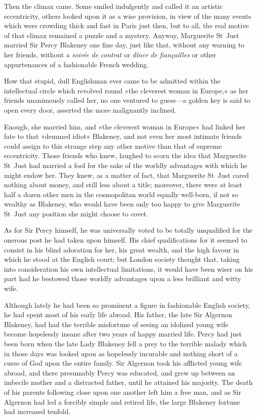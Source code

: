 Then the climax came. Some smiled indulgently and called it an artistic eccentricity, others looked upon it as a wise provision, in view of the many events which were crowding thick and fast in Paris just then, but to all, the real motive of that climax remained a puzzle and a mystery. Anyway, Marguerite St~Just married Sir Percy Blakeney one fine day, just like that, without any warning to her friends, without a \textit{soirée de contrat} or \textit{dîner de fiançailles} or other appurtenances of a fashionable French wedding.

How that stupid, dull Englishman ever came to be admitted within the intellectual circle which revolved round »the cleverest woman in Europe,« as her friends unanimously called her, no one ventured to guess—a golden key is said to open every door, asserted the more malignantly inclined.

Enough, she married him, and »the cleverest woman in Europe« had linked her fate to that »demmed idiot« Blakeney, and not even her most intimate friends could assign to this strange step any other motive than that of supreme eccentricity. Those friends who knew, laughed to scorn the idea that Marguerite St~Just had married a fool for the sake of the worldly advantages with which he might endow her. They knew, as a matter of fact, that Marguerite St~Just cared nothing about money, and still less about a title; moreover, there were at least half a dozen other men in the cosmopolitan world equally well-born, if not so wealthy as Blakeney, who would have been only too happy to give Marguerite St~Just any position she might choose to covet.

As for Sir Percy himself, he was universally voted to be totally unqualified for the onerous post he had taken upon himself. His chief qualifications for it seemed to consist in his blind adoration for her, his great wealth, and the high favour in which he stood at the English court; but London society thought that, taking into consideration his own intellectual limitations, it would have been wiser on his part had he bestowed those worldly advantages upon a less brilliant and witty wife.

Although lately he had been so prominent a figure in fashionable English society, he had spent most of his early life abroad. His father, the late Sir Algernon Blakeney, had had the terrible misfortune of seeing an idolized young wife become hopelessly insane after two years of happy married life. Percy had just been born when the late Lady Blakeney fell a prey to the terrible malady which in those days was looked upon as hopelessly incurable and nothing short of a curse of God upon the entire family. Sir Algernon took his afflicted young wife abroad, and there presumably Percy was educated, and grew up between an imbecile mother and a distracted father, until he attained his majority. The death of his parents following close upon one another left him a free man, and as Sir Algernon had led a forcibly simple and retired life, the large Blakeney fortune had increased tenfold.

